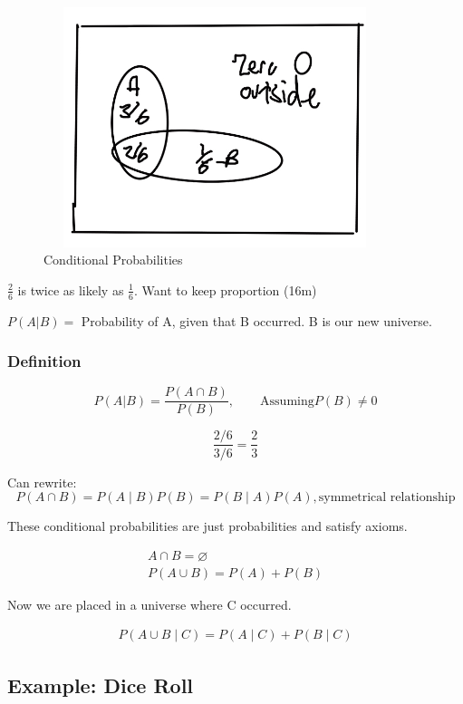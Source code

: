 \documentclass{article}
\begin{document}
\begin{figure}[ht]
\centering
\includegraphics[width=10cm, height=7cm]{images/L02/cond_prob.jpeg}
\caption{Conditional Probabilities}
\end{figure}

$\frac{2}{6}$ is twice as likely as $\frac{1}{6}$. Want to keep proportion (16m)

$P(A|B)=$ Probability of A, given that B occurred.  B is our new universe.

\subsubsection{Definition}

$$
P(A|B) = \frac{P(A \cap B)}{P(B)}, \qquad \text{Assuming} P(B) \ne 0
$$

$$
\frac{2/6}{3/6} = \frac{2}{3}
$$

 Can rewrite:
$$
P(A \cap B) = P(A \mid B)P(B) = P(B \mid A)P(A), \text{symmetrical relationship} 
$$

 These conditional probabilities are just probabilities and satisfy axioms.

\begin{align*}
A \cap B = \varnothing\\
P(A \cup B) = P(A) + P(B)
\end{align*}

Now we are placed in a universe where C occurred.

\begin{align*}
P(A \cup B \mid C) = P(A \mid C) + P(B \mid C)
\end{align*}

\subsection{Example: Dice Roll}
\end{document}
